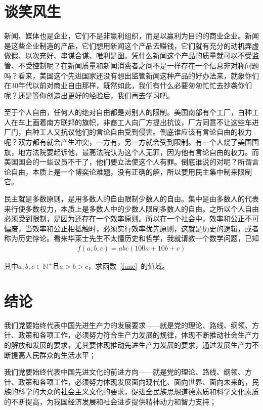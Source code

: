 \chapter{谈笑风生}
新闻、媒体也是企业，它们不是非赢利组织，而是以赢利为目的的商业企业。新闻是这些企业制造的产品，它们想用新闻这个产品去赚钱，它们就有充分的动机弄虚做假、以次充好、串谋合谋、唯利是图。凭什么新闻这个产品的质量就可以不受监管、不受控制呢？在新闻质量和新闻消费者之间不是一样存在一个信息非对称问题吗？看来，美国这个先进国家还没有想出监管新闻这种产品的好办法来，就象你们在30年代以前对商业自由那样，既然如此，我们有什么必要匆匆忙忙去抄袭你们呢？还是等你创造出更好的经验后，我们再去学习吧。

至于个人自由，任何人的绝对自由都是对别人的限制。美国南部有个工厂，白种工人在车上画着南方联邦的旗帜，非裔工人向厂方提出抗议，厂方同意不让这些车进厂门，白种工人又抗议他们的言论自由受到侵害。倒底谁应该有言论自由的权力呢？双方都有就会产生冲突，一方有，另一方就会受到限制。有一个人烧了美国国旗，地方法院要起诉他，最高法院认为这个人无罪，因为他有言论自由的权力。而美国国会的一些议员不干了，他们要立法使这个人有罪。倒底谁说的对呢？所谓言论自由，本质上是一个博奕论难题，没有正确的解，所以要用民主集中制来限制它。

民主就是多数原则，是用多数人的自由限制少数人的自由。集中是由多数人的代表来行使多数权力，本质上是多数人中的少数人限制多数人的自由。之所以个人自由必须受到限制，是因为还存在一个效率原则。所以在一个社会中，效率和公正不可偏废，当效率和公正相抵触时，必须实行效率优先原则，这就是历史的逻辑，或者称为历史悖论。看来华莱士先生不太懂历史和哲学，我就请教一个数学问题，已知
\begin{align}
	f(a,b,c)=abc(100a+10b+c)\label{func}
\end{align}

其中\(a,b,c\in \mathbb{N}^+\)且\(a>b>c\)，求函数~\eqref{func}~的值域。

	


\chapter{结论}
我们党要始终代表中国先进生产力的发展要求——就是党的理论、路线、纲领、方针、政策和各项工作，必须努力符合生产力发展的规律，体现不断推动社会生产力的解放和发展的要求，尤其要体现推动先进生产力发展的要求，通过发展生产力不断提高人民群众的生活水平；

我们党要始终代表中国先进文化的前进方向——就是党的理论、路线、纲领、方针、政策和各项工作，必须努力体现发展面向现代化、面向世界、面向未来的，民族的科学的大众的社会主义文化的要求，促进全民族思想道德素质和科学文化素质的不断提高，为我国经济发展和社会进步提供精神动力和智力支持；

